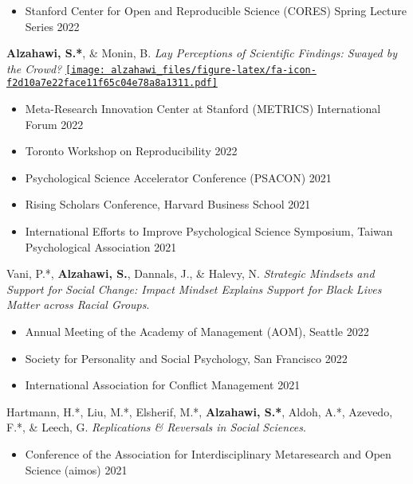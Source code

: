 \documentclass[11pt,a4paper,]{awesome-cv}
\providecommand{\tightlist}{%
	\setlength{\itemsep}{0pt}\setlength{\parskip}{0pt}}
\begin{document}
\begin{itemize}
\tightlist
\item
  Stanford Center for Open and Reproducible Science (CORES) Spring
  Lecture Series \hfill 2022
\end{itemize}

\textbf{Alzahawi, S.*}, \& Monin, B. \emph{Lay Perceptions of Scientific
Findings: Swayed by the Crowd?}
\href{https://shilaan.rbind.io/talks/crowd-science/}{\texttt{[image: alzahawi\_files/figure-latex/fa-icon-f2d10a7e22face11f65c04e78a8a1311.pdf]}}

\begin{itemize}
\tightlist
\item
  Meta-Research Innovation Center at Stanford (METRICS) International
  Forum \hfill 2022
\item
  Toronto Workshop on Reproducibility \hfill 2022
\item
  Psychological Science Accelerator Conference (PSACON) \hfill 2021
\item
  Rising Scholars Conference, Harvard Business School \hfill 2021
\item
  International Efforts to Improve Psychological Science Symposium,
  Taiwan Psychological Association \hfill 2021
\end{itemize}

Vani, P.*, \textbf{Alzahawi, S.}, Dannals, J., \& Halevy, N.
\emph{Strategic Mindsets and Support for Social Change: Impact Mindset
Explains Support for Black Lives Matter across Racial Groups}.

\begin{itemize}
\tightlist
\item
  Annual Meeting of the Academy of Management (AOM), Seattle \hfill 2022
\item
  Society for Personality and Social Psychology, San Francisco
  \hfill 2022
\item
  International Association for Conflict Management \hfill 2021
\end{itemize}

Hartmann, H.*, Liu, M.*, Elsherif, M.*, \textbf{Alzahawi, S.*}, Aldoh,
A.*, Azevedo, F.*, \& Leech, G. \emph{Replications \& Reversals in
Social Sciences}.

\begin{itemize}
\tightlist
\item
  Conference of the Association for Interdisciplinary Metaresearch and
  Open Science (aimos) \hfill 2021
\end{itemize}
\end{document}

